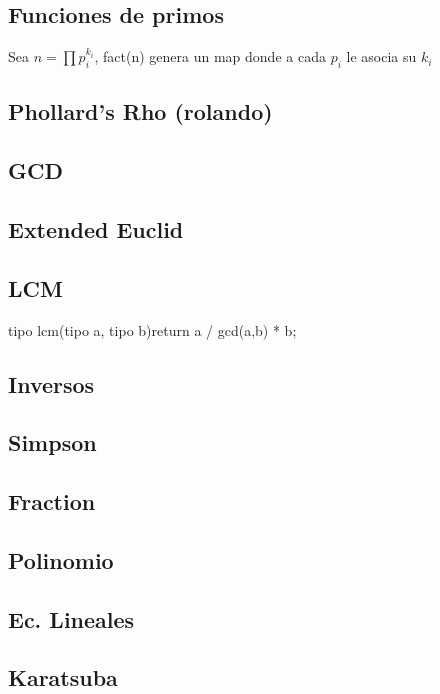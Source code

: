 \subsection{Funciones de primos}
Sea $n=\prod{p_i^{k_i}}$, fact(n) genera un map donde a cada $p_i$ le asocia su $k_i$
\subsection{Phollard's Rho (rolando)}
\subsection{GCD}
\subsection{Extended Euclid}
\subsection{LCM}
\begin{code}
tipo lcm(tipo a, tipo b){return a / gcd(a,b) * b;}
\end{code}
\subsection{Inversos}
\subsection{Simpson}
\subsection{Fraction}
\subsection{Polinomio}
\subsection{Ec. Lineales}

\subsection{Karatsuba}

